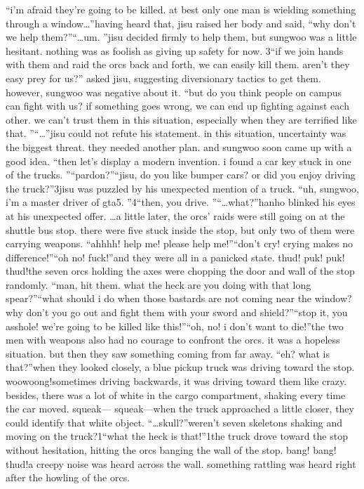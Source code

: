 “i’m afraid they’re going to be killed.
 at best only one man is wielding something through a window…”having heard that, jisu raised her body and said, “why don’t we help them?”“…um.
”jisu decided firmly to help them, but sungwoo was a little hesitant.
 nothing was as foolish as giving up safety for now.
3“if we join hands with them and raid the orcs back and forth, we can easily kill them.
 aren’t they easy prey for us?” asked jisu, suggesting diversionary tactics to get them.
however, sungwoo was negative about it.
“but do you think people on campus can fight with us? if something goes wrong, we can end up fighting against each other.
 we can’t trust them in this situation, especially when they are terrified like that.
”“…”jisu could not refute his statement.
 in this situation, uncertainty was the biggest threat.
they needed another plan.
 and sungwoo soon came up with a good idea.
“then let’s display a modern invention.
 i found a car key stuck in one of the trucks.
”“pardon?”“jisu, do you like bumper cars? or did you enjoy driving the  truck?”3jisu was puzzled by his unexpected mention of a truck.
“uh, sungwoo, i’m a master driver of gta5.
”4“then, you drive.
”“…what?”hanho blinked his eyes at his unexpected offer.
…a little later, the orcs’ raids were still going on at the shuttle bus stop.
 there were five stuck inside the stop, but only two of them were carrying weapons.
“ahhhh! help me! please help me!”“don’t cry! crying makes no difference!”“oh no! fuck!”and they were all in a panicked state.
thud! puk! puk! thud!the seven orcs holding the axes were chopping the door and wall of the stop randomly.
“man, hit them.
 what the heck are you doing with that long spear?”“what should i do when those bastards are not coming near the window? why don’t you go out and fight them with your sword and shield?”“stop it, you asshole! we’re going to be killed like this!”“oh, no! i don’t want to die!”the two men with weapons also had no courage to confront the orcs.
 it was a hopeless situation.
but then they saw something coming from far away.
“eh? what is that?”when they looked closely, a blue pickup truck was driving toward the stop.
woowoong!sometimes driving backwards, it was driving toward them like crazy.
 besides, there was a lot of white in the cargo compartment, shaking every time the car moved.
squeak— squeak—when the truck approached a little closer, they could identify that white object.
“…skull?”weren’t seven skeletons shaking and moving on the truck?1“what the heck is that!”1the truck drove toward the stop without hesitation, hitting the orcs banging the wall of the stop.
bang! bang! thud!a creepy noise was heard across the wall.
 something rattling was heard right after the howling of the orcs.


